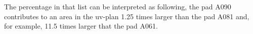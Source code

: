 \documentclass{aa}
\begin{document}
\begin{appendix}
\begin{verbatim}
\end{verbatim}


The percentage in that  list can be interpreted as following, the pad A090 contributes to an area in the uv-plan 1.25 times larger than the pad A081 and, for example, 11.5 times larger that the pad A061.



\end{appendix}
\end{document}

